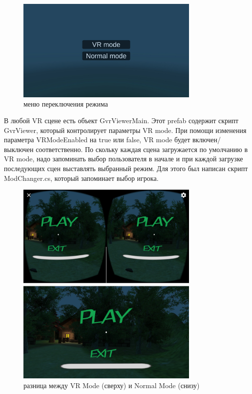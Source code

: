 \begin{figure}[h!]
    \centering
    \includegraphics[width=0.8\textwidth]{./screenshots/modes.jpg}
    \caption{\small{меню переключения режима}}
    \label{modes}
\end{figure}

\tab[0.75cm]В любой VR сцене есть объект GvrViewerMain. Этот prefab содержит 
скрипт GvrViewer, который контролирует параметры VR mode. При помощи изменения 
параметра VRModeEnabled на true или false, VR mode будет включен/ выключен 
соответственно. По скольку каждая сцена загружается по умолчанию в VR mode, 
надо запоминать выбор пользователя в начале и при каждой загрузке последующих 
сцен выставлять выбранный режим. Для этого был написан скрипт ModChanger.cs, 
который запоминает выбор игрока.

\begin{figure}[h!]
	\centering
	\includegraphics[width=0.8\textwidth]{./screenshots/diff.jpg}
	\caption{\small{разница между VR Mode (сверху) и Normal Mode (снизу)}}
	\label{diff}
\end{figure}
\newpage
